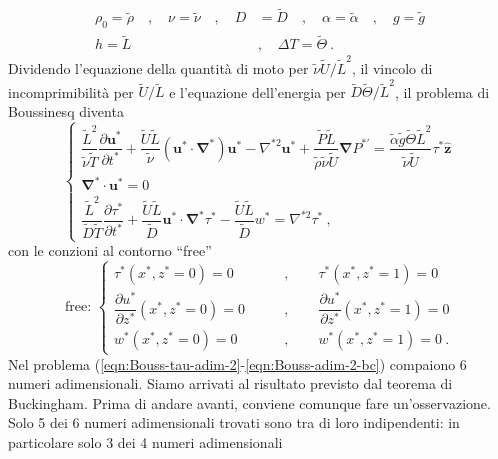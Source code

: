 \documentclass{article}
\begin{document}
\begin{equation}\label{eqn:var-adim-2}
\begin{aligned}
    \rho_0 = \tilde{\rho} \quad  , \quad \nu = \tilde{\nu} \quad , \quad D & = \tilde{D}  \quad , \quad \alpha = \tilde{\alpha}  \quad , \quad g = \tilde{g}  \\
    h = \tilde{L}  \quad & , \quad \Delta T = \tilde{\Theta}  \ .
\end{aligned}
\end{equation}
Dividendo l'equazione della quantità di moto per $\tilde{\nu}\tilde{U}/\tilde{L}^2$, il vincolo di incomprimibilità per $\tilde{U}/\tilde{L}$ e l'equazione dell'energia per $\tilde{D}\tilde{\Theta}/\tilde{L}^2$, il problema di Boussinesq diventa
\begin{equation}\label{eqn:Bouss-tau-adim-2}
    \begin{cases}
      \dfrac{\tilde{L}^2}{\tilde{\nu}\tilde{T}}\dfrac{\partial \bm{u}^*}{\partial t^*} + \dfrac{\tilde{U}\tilde{L}}{\tilde{\nu}}
      \left( \bm{u}^* \cdot \bm{\nabla}^* \right) \bm{u}^* -
      \nabla^{*2} \bm{u}^* + \dfrac{\tilde{P}\tilde{L}}{\tilde{\rho} \tilde{\nu} \tilde{U}}\bm{\nabla} P^{*'} = \dfrac{\tilde{\alpha} \tilde{g} \tilde{\Theta} \tilde{L}^2}{\tilde{\nu} \tilde{U}} \tau^* \bm{\hat{z}} \\
      \bm{\nabla}^* \cdot \bm{u}^* = 0 \\
      \dfrac{\tilde{L}^2}{\tilde{D}\tilde{T}}\dfrac{\partial \tau^*}{\partial t^*} + \dfrac{\tilde{U}\tilde{L}}{\tilde{D}}\bm{u}^* \cdot 
      \bm{\nabla}^* \tau^* - \dfrac{\tilde{U}\tilde{L}}{\tilde{D}} w^* = \nabla^{*2} \tau^* \ ,
    \end{cases}
\end{equation}
con le conzioni al contorno ``free''
\begin{equation}\label{eqn:Bouss-adim-2-bc}
    \text{free: }
    \left\{
    \begin{aligned}
      \tau^*(x^*,z^*=0) = 0 \qquad  & , \qquad 
      \tau^*(x^*,z^*=1) = 0 \\
      \dfrac{\partial u^*}{\partial z^*}(x^*,z^*=0) = 0 \qquad & , \qquad 
      \dfrac{\partial u^*}{\partial z^*}(x^*,z^*=1) = 0 \\
      w^*(x^*,z^*=0) = 0 \qquad & , \qquad w^*(x^*,z^*=1) = 0 \ .
    \end{aligned} \right.
\end{equation}
Nel problema (\ref{eqn:Bouss-tau-adim-2}-\ref{eqn:Bouss-adim-2-bc}) compaiono 6 numeri adimensionali. Siamo arrivati al risultato previsto dal teorema di Buckingham. Prima di andare avanti, conviene comunque fare un'osservazione. Solo 5 dei 6 numeri adimensionali trovati sono tra di loro indipendenti: in particolare solo 3 dei 4 numeri adimensionali
\end{document}

